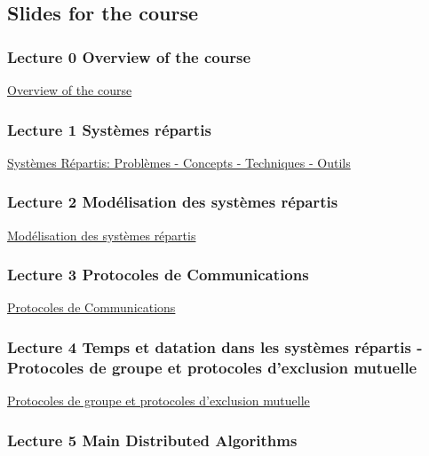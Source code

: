 \documentclass[ 12pt]{article}
\begin{document}
\subsection{Slides for the course}
\label{sec:slides}


\subsubsection{Lecture 0 {Overview of the course }}
  
  \href{http://mery54.github.io/teaching/aspd/lecturesnotes/ASPD0.pdf}{Overview of the course }


\subsubsection{Lecture 1 {Systèmes répartis}}
  
\href{http://mery54.github.io/teaching/aspd/lecturesnotes/ASPD1.pdf}{Syst\`emes
  R\'epartis: Probl\`emes  - Concepts - Techniques - Outils}



\subsubsection{Lecture 2 {Mod\'elisation   des syst\`emes  r\'epartis}}
  
\href{http://mery54.github.io/teaching/aspd/lecturesnotes/ASPD2.pdf}{Mod\'elisation   des syst\`emes  r\'epartis}




\subsubsection{Lecture 3 {Protocoles de Communications}}
  
\href{http://mery54.github.io/teaching/aspd/lecturesnotes/ASPD3.pdf}{Protocoles de Communications}




\subsubsection{Lecture 4 Temps et datation  dans les syst\`emes 
  r\'epartis -  Protocoles de groupe et protocoles d'exclusion mutuelle }
  
\href{http://mery54.github.io/teaching/aspd/lecturesnotes/ASPD4.pdf}{Protocoles
  de groupe et protocoles d'exclusion mutuelle}


\subsubsection{Lecture 5  Main Distributed  Algorithms}
  
\end{document}
